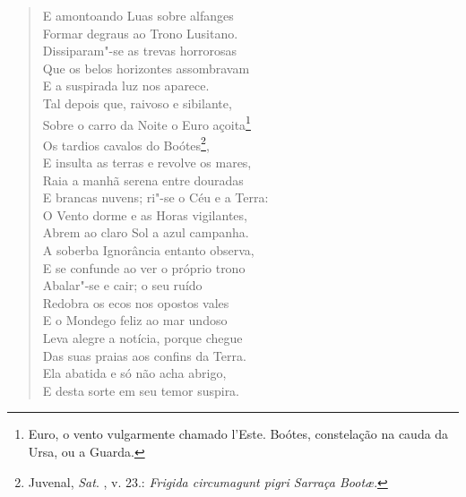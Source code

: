 \begin{verse}
E amontoando Luas sobre alfanges\\ %
Formar degraus ao Trono Lusitano.\\
Dissiparam"-se as trevas horrorosas\\
Que os belos horizontes assombravam\\
E a suspirada luz nos aparece.\\
Tal depois que, raivoso e sibilante,\\
Sobre o carro da Noite o Euro açoita\footnote{ Euro, o vento
vulgarmente chamado l'Este. Boótes, constelação na cauda da Ursa, ou a Guarda.}\\
Os tardios cavalos do Boótes\footnote{ Juvenal, \textit{Sat}. , v. 23.:
\textit{Frigida circumagunt pigri Sarraça Boot\ae}.},\\
E insulta as terras e revolve os mares,\\
Raia a manhã serena entre douradas\\
E brancas nuvens; ri"-se o Céu e a Terra:\\
O Vento dorme e as Horas vigilantes,\\
Abrem ao claro Sol a azul campanha. \\[10pt]


A soberba Ignorância entanto observa,\\			\index{\Ignor}
E se confunde ao ver o próprio trono\\
Abalar"-se e cair; o seu ruído\\
Redobra os ecos nos opostos vales\\
E o Mondego feliz ao mar undoso\\			\index{\Monde}
Leva alegre a notícia, porque chegue\\
Das suas praias aos confins da Terra.\\
Ela abatida e só não acha abrigo,\\
E desta sorte em seu temor suspira. \\[10pt]



\end{verse}
